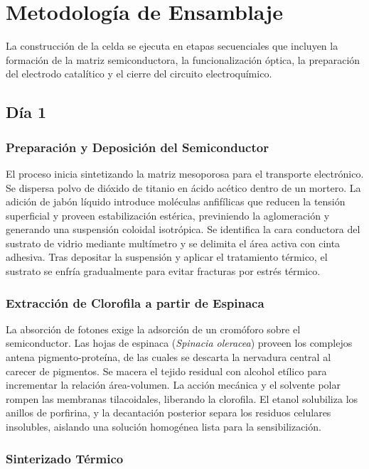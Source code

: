 \documentclass[11pt, a4paper]{article}
\begin{document}
\section{Metodología de Ensamblaje}

La construcción de la celda se ejecuta en etapas secuenciales que incluyen la
formación de la matriz semiconductora, la funcionalización óptica, la
preparación del electrodo catalítico y el cierre del circuito electroquímico.

\subsection{Día 1}
\subsubsection{Preparación y Deposición del Semiconductor}

El proceso inicia sintetizando la matriz mesoporosa para el transporte
electrónico. Se dispersa polvo de dióxido de titanio en ácido acético dentro
de un mortero. La adición de jabón líquido introduce moléculas anfifílicas que
reducen la tensión superficial y proveen estabilización estérica, previniendo
la aglomeración y generando una suspensión coloidal isotrópica. Se identifica
la cara conductora del sustrato de vidrio mediante multímetro y se delimita el
área activa con cinta adhesiva. Tras depositar la suspensión y aplicar el
tratamiento térmico, el sustrato se enfría gradualmente para evitar fracturas
por estrés térmico.

\subsubsection{Extracción de Clorofila a partir de Espinaca}

La absorción de fotones exige la adsorción de un cromóforo sobre el
semiconductor. Las hojas de espinaca (\textit{Spinacia oleracea}) proveen los
complejos antena pigmento-proteína, de las cuales se descarta la nervadura
central al carecer de pigmentos. Se macera el tejido residual con alcohol
etílico para incrementar la relación área-volumen. La acción mecánica y el
solvente polar rompen las membranas tilacoidales, liberando la clorofila. El
etanol solubiliza los anillos de porfirina, y la decantación posterior separa
los residuos celulares insolubles, aislando una solución homogénea lista para
la sensibilización.

\subsubsection{Sinterizado Térmico}
\end{document}
